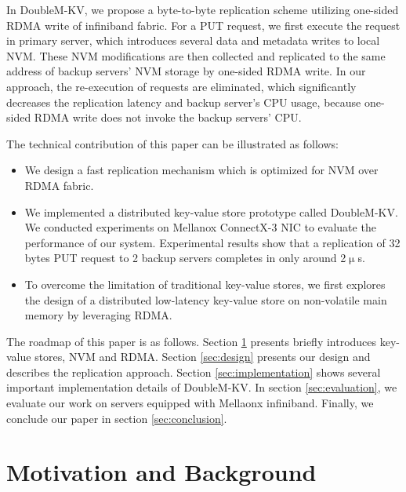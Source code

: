 \documentclass[format=acmsmall, review=false, screen=true]{acmart}
\begin{document}
	\par In DoubleM-KV, we propose a byte-to-byte replication scheme utilizing one-sided RDMA write of infiniband fabric. For a PUT	request, we first execute the request in primary server, which introduces several data and metadata writes to local NVM. These NVM modifications are then collected and replicated to the same address of backup servers' NVM storage by one-sided RDMA write. In our approach, the re-execution of requests are eliminated, which significantly decreases the replication latency and backup server's CPU usage, because one-sided RDMA write does not invoke the backup servers' CPU. 
		
	\noindent The technical contribution of this paper can be illustrated as follows:

	\begin{itemize}
		\item We design a fast replication mechanism which is optimized for NVM over RDMA fabric.
		\item We implemented a distributed key-value store prototype called DoubleM-KV. We conducted experiments on Mellanox ConnectX-3 NIC to evaluate the performance of our system. Experimental results show that a replication of 32 bytes PUT request to 2 backup servers completes in only around 2$\upmu$s. 
		\item To overcome the limitation of traditional key-value stores, we first explores the design of a distributed low-latency key-value store on non-volatile main memory by leveraging RDMA. 
	\end{itemize}

	The roadmap of this paper is as follows. Section \ref{sec:motivation} presents briefly introduces key-value stores, NVM and RDMA. Section \ref{sec:design} presents our design and describes the replication approach. Section \ref{sec:implementation} shows several important implementation details of DoubleM-KV. In section \ref{sec:evaluation}, we evaluate our work on servers equipped with Mellaonx infiniband. Finally, we conclude our paper in section \ref{sec:conclusion}.
	
\section{Motivation and Background}\label{sec:motivation}
	
\end{document}
